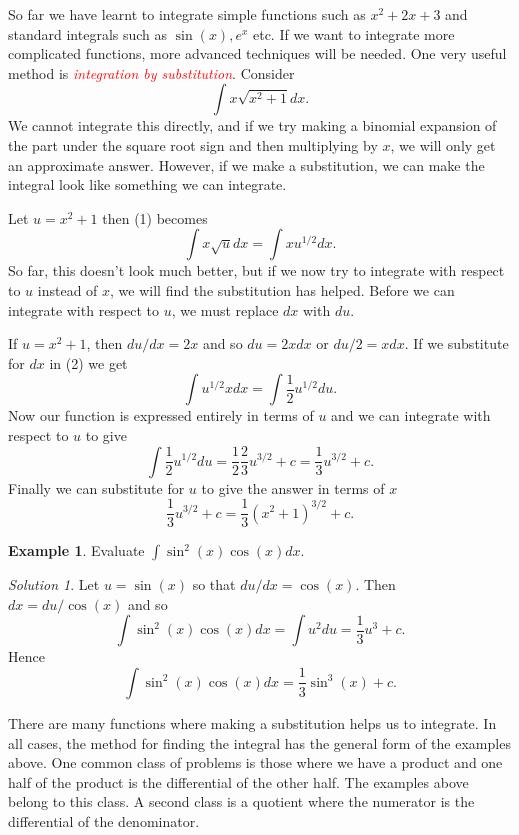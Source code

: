 \documentclass[
  11pt,
  oneside]{book}
\newcommand{\slide}{}
\newcommand{\cpybx}{}
\newcommand{\ecpybx}{}
\theoremstyle{definition}
\theoremstyle{definition}
\newtheorem{example}{Example}[chapter]
\theoremstyle{definition}
\theoremstyle{definition}
\theoremstyle{remark}
\newtheorem*{solution}{Solution}
\begin{document}
So far we have learnt to integrate simple functions such as \(x^2 + 2x + 3\) and standard integrals such as \(\sin(x), e^x\) etc. If we want to integrate more complicated functions, more advanced techniques will be needed. One very useful method is \textcolor{red}{\em integration by substitution}. Consider
\[
\int x\sqrt{x^2+1} dx.\tag{1}
\]
We cannot integrate this directly, and if we try making a binomial expansion of the part under the square root sign and then multiplying by \(x\), we will only get an approximate answer. However, if we make a substitution, we can make the integral look like something we can integrate.

Let \(u = x^2+ 1\) then (1) becomes
\[
\int x\sqrt{u} dx=\int xu^{1/2} dx.\tag{2}
\]
So far, this doesn't look much better, but if we now try to integrate with respect to \(u\) instead of \(x\), we will find the substitution has helped. Before we can integrate with respect to \(u\), we must replace \(dx\) with \(du\).

If \(u = x^2+ 1\), then \(du/dx = 2x\) and so \(du = 2x dx\) or \(du/2 = xdx\).
If we substitute for \(dx\) in (2) we get
\[
\int u^{1/2}xdx = \int\frac12u^{1/2}du.
\]
Now our function is expressed entirely in terms of \(u\) and we can integrate with respect to \(u\) to give
\[
\int\frac12u^{1/2}du = \frac 12\frac23u^{3/2}+c = \frac13u^{3/2}+c.
\]
Finally we can substitute for \(u\) to give the answer in terms of \(x\)
\[
\frac 13u^{3/2}+c = \frac13(x^2+1)^{3/2}+c.
\]
\slide

\cpybx

\begin{example}
Evaluate \(\displaystyle\int\sin^2(x)\cos(x)dx\).
\end{example}

\ecpybx\slide\copy\copybox

\begin{solution}
Let \(u = \sin(x)\) so that \(du/dx = \cos(x)\). Then \(dx = du/\cos(x)\) and so
\[
\int\sin^2(x)\cos(x)dx = \int u^2du = \frac 13u^3+c.
\]
Hence
\[
\int\sin^2(x)\cos(x)dx = \frac 13\sin^3(x) + c.
\]
\end{solution}

\slide

There are many functions where making a substitution helps us to integrate. In all cases, the method for finding the integral has the general form of the examples above. One common class of problems is those where we have a product and one half of the product is the differential of the other half. The examples above belong to this class. A second class is a quotient where the numerator is the differential of the denominator.
\end{document}
